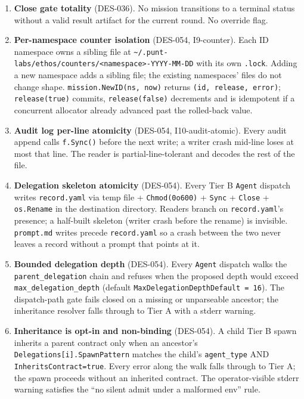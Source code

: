 \documentclass[a4paper,10pt]{article}
\newcommand{\field}[1]{\texttt{#1}}
\newcommand{\fpath}[1]{\texttt{#1}}
\begin{document}
\begin{enumerate}
  \item \textbf{Close gate totality} (DES-036).  No mission
    transitions to a terminal status without a valid result
    artifact for the current round.  No override flag.

  \item \textbf{Per-namespace counter isolation}
    (DES-054, I9-counter).  Each ID namespace owns a sibling file
    at
    \fpath{\~{}/.punt-labs/ethos/counters/<namespace>-YYYY-MM-DD}
    with its own \texttt{.lock}.  Adding a new namespace adds a
    sibling file; the existing namespaces' files do not change
    shape.  \texttt{mission.NewID(ns, now)} returns
    \texttt{(id, release, error)}; \texttt{release(true)} commits,
    \texttt{release(false)} decrements and is idempotent if a
    concurrent allocator already advanced past the rolled-back
    value.

  \item \textbf{Audit log per-line atomicity}
    (DES-054, I10-audit-atomic).  Every audit append calls
    \texttt{f.Sync()} before the next write; a writer crash
    mid-line loses at most that line.  The reader is
    partial-line-tolerant and decodes the rest of the file.

  \item \textbf{Delegation skeleton atomicity} (DES-054).  Every
    Tier B \texttt{Agent} dispatch writes \texttt{record.yaml}
    via temp file + \texttt{Chmod(0o600)} + \texttt{Sync} +
    \texttt{Close} + \texttt{os.Rename} in the destination
    directory.  Readers branch on \texttt{record.yaml}'s presence;
    a half-built skeleton (writer crash before the rename) is
    invisible.  \texttt{prompt.md} writes precede
    \texttt{record.yaml} so a crash between the two never leaves
    a record without a prompt that points at it.

  \item \textbf{Bounded delegation depth} (DES-054).  Every
    \texttt{Agent} dispatch walks the \field{parent\_delegation}
    chain and refuses when the proposed depth would exceed
    \texttt{max\_delegation\_depth} (default
    \texttt{MaxDelegationDepthDefault = 16}).  The dispatch-path
    gate fails closed on a missing or unparseable ancestor; the
    inheritance resolver falls through to Tier A with a stderr
    warning.

  \item \textbf{Inheritance is opt-in and non-binding}
    (DES-054).  A child Tier B spawn inherits a parent contract
    only when an ancestor's \field{Delegations[i].SpawnPattern}
    matches the child's \field{agent\_type} AND
    \field{InheritsContract=true}.  Every error along the walk
    falls through to Tier A; the spawn proceeds without an
    inherited contract.  The operator-visible stderr warning
    satisfies the ``no silent admit under a malformed env'' rule.


\end{enumerate}
\end{document}
